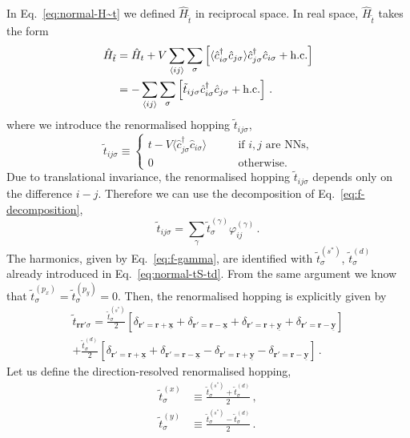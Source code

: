 In Eq.~\eqref{eq:normal-H~t} we defined $\hat H_{\tilde{t}}$ in reciprocal space. In real space, $\hat H_{\tilde{t}}$ takes the form
\[
\begin{aligned}
	\hat H_{\tilde{t}} &= \hat H_t + V \sum_{\ev{ij}} \sum_\sigma \left[
	\langle
	\hat c_{i\sigma}^\dagger \hat c_{j\sigma}
	\rangle \hat c_{j\sigma}^\dagger  \hat c_{i\sigma} + \hc
	\right] \\
	&= - \sum_{\ev{ij}} \sum_\sigma 
	\left[
	\tilde{t}_{ij\sigma} \hat c_{i\sigma}^\dagger \hat c_{j\sigma} + \hc
	\right] \, .
\end{aligned}
\]
where we introduce the renormalised hopping $\tilde{t}_{ij\sigma}$,
\[
	\tilde{t}_{ij\sigma} \equiv
	\begin{cases}
		\displaystyle t - V \langle \hat c_{j\sigma}^\dagger \hat c_{i\sigma} \rangle
		\qquad
		&\text{if $i,j$ are NNs,} \\
		0 &\text{otherwise.}
	\end{cases}
\]
Due to translational invariance, the renormalised hopping $\tilde{t}_{ij\sigma}$ depends only on the difference $i-j$. Therefore we can use the decomposition of Eq.~\eqref{eq:f-decomposition},
\[
	\tilde{t}_{ij\sigma} = \sum_\gamma \tilde{t}^{(\gamma)}_\sigma \varphi_{ij}^{(\gamma)} \, .
\]
The harmonics, given by Eq.~\eqref{eq:f-gamma}, are identified with $\tilde{t}_\sigma^{(s^*)}$, $\tilde{t}_\sigma^{(d)}$ already introduced in Eq.~\eqref{eq:normal-tS-td}. From the same argument we know that $\tilde{t}_\sigma^{(p_x)}=\tilde{t}_\sigma^{(p_y)}=0$. Then, the renormalised hopping is explicitly given by
\begin{multline*}
	\tilde{t}_{\mathbf{r}\mathbf{r}'\sigma} = \frac{\tilde{t}_\sigma^{(s^*)}}{2} \left[
		\delta_{\mathbf{r}'=\mathbf{r}+\underline{\mathbf{x}}} + \delta_{\mathbf{r}'=\mathbf{r}-\underline{\mathbf{x}}} + \delta_{\mathbf{r}'=\mathbf{r}+\underline{\mathbf{y}}} + \delta_{\mathbf{r}'=\mathbf{r}-\underline{\mathbf{y}}}
	\right] \\
	+ \frac{\tilde{t}_\sigma^{(d)}}{2} \left[
		\delta_{\mathbf{r}'=\mathbf{r}+\underline{\mathbf{x}}} + \delta_{\mathbf{r}'=\mathbf{r}-\underline{\mathbf{x}}} - \delta_{\mathbf{r}'=\mathbf{r}+\underline{\mathbf{y}}} - \delta_{\mathbf{r}'=\mathbf{r}-\underline{\mathbf{y}}}
	\right] \, .
\end{multline*}
Let us define the direction-resolved renormalised hopping,
\begin{align}
	\tilde{t}_\sigma^{(x)} &\equiv \frac{\tilde{t}_\sigma^{(s^*)} + \tilde{t}_\sigma^{(d)}}{2} \, , \label{eq:normal-tx} \\
	\tilde{t}_\sigma^{(y)} &\equiv \frac{\tilde{t}_\sigma^{(s^*)} - \tilde{t}_\sigma^{(d)}}{2} \, . \label{eq:normal-ty}
\end{align}
